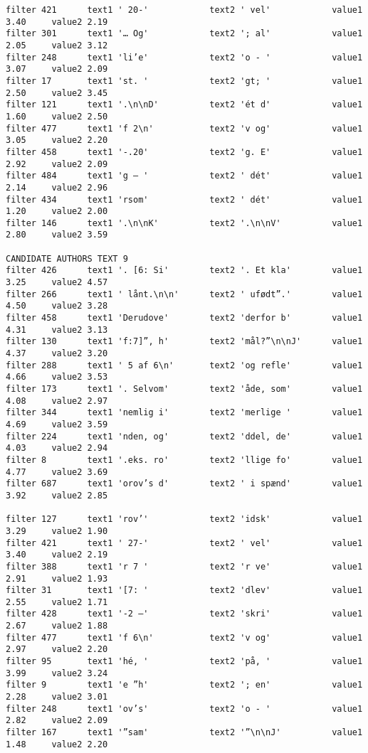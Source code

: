 {\begin{verbatim}
filter 421      text1 ' 20-'            text2 ' vel'            value1 3.40     value2 2.19
filter 301      text1 '… Og'            text2 '; al'            value1 2.05     value2 3.12
filter 248      text1 'li’e'            text2 'o - '            value1 3.07     value2 2.09
filter 17       text1 'st. '            text2 'gt; '            value1 2.50     value2 3.45
filter 121      text1 '.\n\nD'          text2 'ét d'            value1 1.60     value2 2.50
filter 477      text1 'f 2\n'           text2 'v og'            value1 3.05     value2 2.20
filter 458      text1 '-.20'            text2 'g. E'            value1 2.92     value2 2.09
filter 484      text1 'g – '            text2 ' dét'            value1 2.14     value2 2.96
filter 434      text1 'rsom'            text2 ' dét'            value1 1.20     value2 2.00
filter 146      text1 '.\n\nK'          text2 '.\n\nV'          value1 2.80     value2 3.59

CANDIDATE AUTHORS TEXT 9
filter 426      text1 '. [6: Si'        text2 '. Et kla'        value1 3.25     value2 4.57
filter 266      text1 ' lånt.\n\n'      text2 ' ufødt”.'        value1 4.50     value2 3.28
filter 458      text1 'Derudove'        text2 'derfor b'        value1 4.31     value2 3.13
filter 130      text1 'f:7]”, h'        text2 'mål?”\n\nJ'      value1 4.37     value2 3.20
filter 288      text1 ' 5 af 6\n'       text2 'og refle'        value1 4.66     value2 3.53
filter 173      text1 '. Selvom'        text2 'åde, som'        value1 4.08     value2 2.97
filter 344      text1 'nemlig i'        text2 'merlige '        value1 4.69     value2 3.59
filter 224      text1 'nden, og'        text2 'ddel, de'        value1 4.03     value2 2.94
filter 8        text1 '.eks. ro'        text2 'llige fo'        value1 4.77     value2 3.69
filter 687      text1 'orov’s d'        text2 ' i spænd'        value1 3.92     value2 2.85

filter 127      text1 'rov’'            text2 'idsk'            value1 3.29     value2 1.90
filter 421      text1 ' 27-'            text2 ' vel'            value1 3.40     value2 2.19
filter 388      text1 'r 7 '            text2 'r ve'            value1 2.91     value2 1.93
filter 31       text1 '[7: '            text2 'dlev'            value1 2.55     value2 1.71
filter 428      text1 '-2 –'            text2 'skri'            value1 2.67     value2 1.88
filter 477      text1 'f 6\n'           text2 'v og'            value1 2.97     value2 2.20
filter 95       text1 'hé, '            text2 'på, '            value1 3.99     value2 3.24
filter 9        text1 'e ”h'            text2 '; en'            value1 2.28     value2 3.01
filter 248      text1 'ov’s'            text2 'o - '            value1 2.82     value2 2.09
filter 167      text1 '”sam'            text2 '”\n\nJ'          value1 1.48     value2 2.20


\end{verbatim}}

